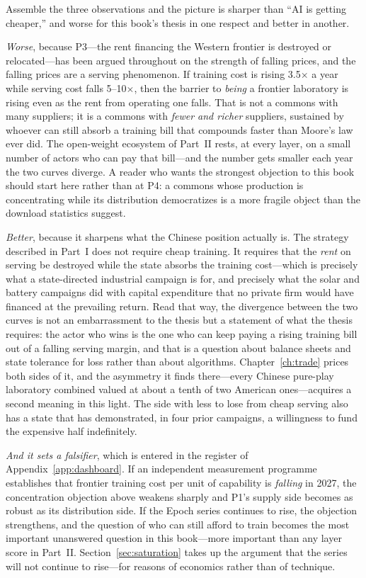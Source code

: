 Assemble the three observations and the picture is sharper than ``AI is getting cheaper,'' and worse for this book's thesis in one respect and better in another.

\emph{Worse}, because P3---the rent financing the Western frontier is destroyed or relocated---has been argued throughout on the strength of falling prices, and the falling prices are a serving phenomenon. If training cost is rising 3.5$\times$ a year while serving cost falls 5--10$\times$, then the barrier to \emph{being} a frontier laboratory is rising even as the rent from operating one falls. That is not a commons with many suppliers; it is a commons with \emph{fewer and richer} suppliers, sustained by whoever can still absorb a training bill that compounds faster than Moore's law ever did. The open-weight ecosystem of Part~II rests, at every layer, on a small number of actors who can pay that bill---and the number gets smaller each year the two curves diverge. A reader who wants the strongest objection to this book should start here rather than at P4: a commons whose production is concentrating while its distribution democratizes is a more fragile object than the download statistics suggest.

\emph{Better}, because it sharpens what the Chinese position actually is. The strategy described in Part~I does not require cheap training. It requires that the \emph{rent} on serving be destroyed while the state absorbs the training cost---which is precisely what a state-directed industrial campaign is for, and precisely what the solar and battery campaigns did with capital expenditure that no private firm would have financed at the prevailing return. Read that way, the divergence between the two curves is not an embarrassment to the thesis but a statement of what the thesis requires: the actor who wins is the one who can keep paying a rising training bill out of a falling serving margin, and that is a question about balance sheets and state tolerance for loss rather than about algorithms. Chapter~\ref{ch:trade} prices both sides of it, and the asymmetry it finds there---every Chinese pure-play laboratory combined valued at about a tenth of two American ones---acquires a second meaning in this light. The side with less to lose from cheap serving also has a state that has demonstrated, in four prior campaigns, a willingness to fund the expensive half indefinitely.

\emph{And it sets a falsifier}, which is entered in the register of Appendix~\ref{app:dashboard}. If an independent measurement programme establishes that frontier training cost per unit of capability is \emph{falling} in 2027, the concentration objection above weakens sharply and P1's supply side becomes as robust as its distribution side. If the Epoch series continues to rise, the objection strengthens, and the question of who can still afford to train becomes the most important unanswered question in this book---more important than any layer score in Part~II. Section~\ref{sec:saturation} takes up the argument that the series will not continue to rise---for reasons of economics rather than of technique.

